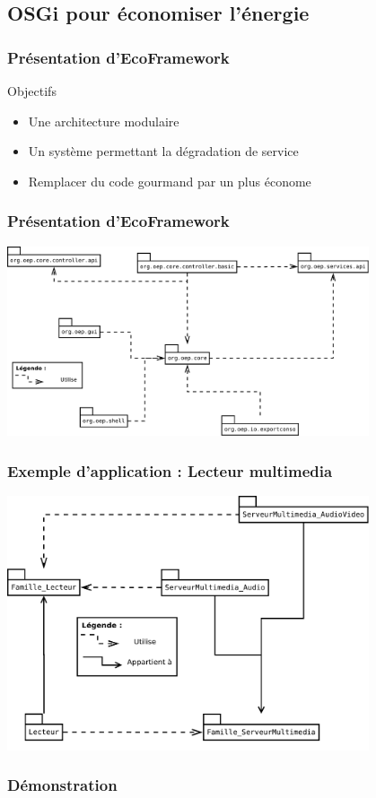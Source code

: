 \documentclass{beamer}
\begin{document}
		\subsection{OSGi pour économiser l'énergie}
			\begin{frame}
				\frametitle{Présentation d'EcoFramework}
					\begin{block}{Objectifs}
						\begin{itemize}
						  \item Une architecture modulaire
						  \item Un système permettant la dégradation de service
						  \item Remplacer du code gourmand par un plus économe
						\end{itemize}
					\end{block}
			\end{frame}
			\begin{frame}
				\frametitle{Présentation d'EcoFramework}
				\begin{center}
					\includegraphics[width=0.8\textwidth]{figures/EcoPattern_Bundle_Diagramme.pdf}
				\end{center}
			\end{frame}
			\begin{frame}
				\frametitle{Exemple d'application : Lecteur multimedia}
				\begin{center}
					\includegraphics[width=0.8\textwidth]{figures/EcoPattern_LecteurMultimedia.pdf}
				\end{center}
			\end{frame}
			\begin{frame}
				\frametitle{Démonstration}
				
			\end{frame}
			
\end{document}

